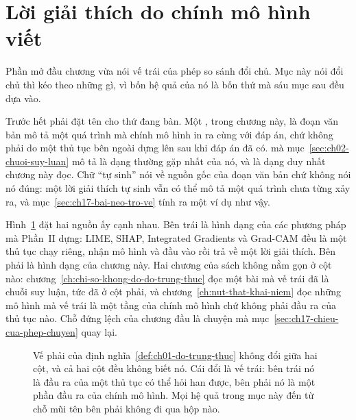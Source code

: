 \section{Lời giải thích do chính mô hình viết}
\label{sec:ch17-loi-giai-thich-tu-viet}

%
Phần mở đầu chương vừa nói vế trái của phép so sánh đổi chủ. Mục này nói đổi chủ
thì kéo theo những gì, vì bốn hệ quả của nó là bốn thứ mà sáu mục sau đều dựa
vào.

%
Trước hết phải đặt tên cho thứ đang bàn. Một
, trong chương này, là đoạn văn bản
mô tả một quá trình mà chính mô hình in ra cùng với đáp án, chứ không phải do
một thủ tục bên ngoài dựng lên sau khi đáp án đã có. 
mà mục~\ref{sec:ch02-chuoi-suy-luan} mô tả là dạng thường gặp nhất của nó, và là
dạng duy nhất chương này đọc. Chữ \enquote{tự sinh} nói về nguồn gốc của đoạn
văn bản chứ không nói nó đúng: một lời giải thích tự sinh vẫn có thể mô tả một
quá trình chưa từng xảy ra, và mục~\ref{sec:ch17-bai-neo-tro-ve} tính ra một ví
dụ như vậy.

Hình~\ref{fig:ch17-hai-nguon-cua-ve-trai} đặt hai nguồn ấy cạnh nhau. Bên trái là
hình dạng của các phương pháp mà Phần~II dựng: LIME, SHAP, Integrated Gradients
và Grad-CAM đều là một thủ tục chạy riêng, nhận mô hình và đầu vào rồi trả về một
lời giải thích. Bên phải là hình dạng của chương này. Hai chương của sách không
nằm gọn ở cột nào: chương~\ref{ch:chi-so-khong-do-do-trung-thuc} đọc một bài mà
vế trái đã là chuỗi suy luận, tức đã ở cột phải, và
chương~\ref{ch:nut-that-khai-niem} đọc những mô hình mà vế trái là một tầng của
chính mô hình chứ không phải đầu ra của thủ tục nào. Chỗ đứng lệch của chương
đầu là chuyện mà mục~\ref{sec:ch17-chieu-cua-phep-chuyen} quay lại.

\begin{figure}[htbp]
  \centering
  
  \caption{Vế phải của định nghĩa~\ref{def:ch01-do-trung-thuc} không đổi giữa
  hai cột, và cả hai cột đều không biết nó. Cái đổi là vế trái: bên trái nó là
  đầu ra của một thủ tục có thể hỏi han được, bên phải nó là một phần đầu ra của
  chính mô hình. Mọi hệ quả trong mục này đến từ chỗ mũi tên bên phải không đi
  qua hộp nào.}
  \label{fig:ch17-hai-nguon-cua-ve-trai}
\end{figure}

